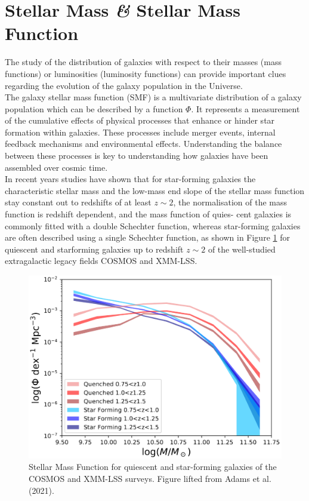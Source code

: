 \section{Stellar Mass \textit{\&} Stellar Mass Function}
The study of the distribution of galaxies with respect to their masses (mass functions) or luminosities (luminosity functions) can provide important clues regarding the evolution of the galaxy population in the Universe.\\
The galaxy stellar mass function (SMF) is a multivariate distribution\cite{Weigel2016} of a galaxy population which can be described by a function $\Phi$. It represents a measurement\cite{Adams2021} of the cumulative effects of physical processes that enhance or hinder star formation within galaxies. These processes include merger events, internal feedback mechanisms and environmental effects. Understanding the balance between these processes is key to understanding how galaxies have been assembled over cosmic time.\\ %
In recent years studies\cite{Weigel2016} have shown that for star-forming galaxies the characteristic stellar mass and the low-mass end slope of the stellar mass function stay constant out to redshifts of at least $z \sim 2$, the normalisation of the
mass function is redshift dependent, and the mass function of quies-
cent galaxies is commonly fitted with a double Schechter\cite{Sche1976} function, whereas star-forming galaxies are often described using a single Schechter function, as shown in Figure \ref{fig:AdamsSMF} for quiescent and starforming galaxies up to redshift $z\sim 2$ of the well-studied extragalactic legacy fields COSMOS and XMM-LSS\cite{Adams2021}.
\begin{figure}[htbp]
    \centering
    \includegraphics[width=0.7\linewidth]{figures/AdamsSMF.png}
    \caption{Stellar Mass Function for quiescent and star-forming galaxies of the COSMOS and XMM-LSS surveys. Figure lifted from Adams et al. (2021)\cite{Adams2021}.}
    \label{fig:AdamsSMF}
\end{figure}
